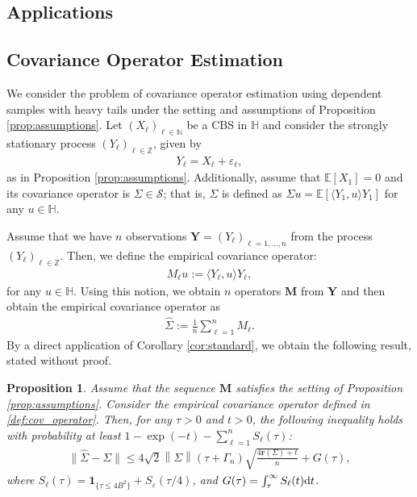 \documentclass[11pt,a4paper]{article}
\newtheorem{proposition}[theorem]{Proposition}
\theoremstyle{remark}
\theoremstyle{definition}
\theoremstyle{definition}
\newcommand{\Ep}{\mathbb{E}}
\renewcommand{\hat}{\widehat}
\newcommand{\Surv}{S}
\newcommand{\rc}{\color{black}}
\begin{document}
\begin{bibunit}[apalike]
\section{Applications} \label{sec:application}

\subsection{Covariance Operator Estimation} \label{sec:ex_covariance}

We consider the problem of covariance operator estimation using dependent samples with heavy tails {\rc under the setting and assumptions of Proposition \ref{prop:assumptions}}.
Let $(X_\ell)_{\ell \in \mathbb{N}}$ be a CBS in $\mathbb{H}$ and consider the strongly stationary process  $(Y_\ell)_{\ell \in \mathbb{Z}}$, given by
\begin{align*}
    Y_\ell = X_\ell + \varepsilon_\ell,
\end{align*}
as in Proposition \ref{prop:assumptions}.
Additionally, assume that $\Ep[X_1] = 0$ and its covariance operator is $\Sigma \in \mathcal{S}$; that is, $\Sigma$ is defined as $\Sigma u = \Ep[ \langle Y_1, u \rangle Y_1]$ for any $u \in \mathbb{H}$.


{\rc Assume that }we have $n$ observations $\mathbf{Y} = (Y_\ell)_{\ell = 1,\ldots,n}$ from the process $(Y_\ell)_{\ell \in \mathbb{Z}}$. Then, we define the empirical covariance operator:
\begin{align*}
    M_\ell u :=\langle Y_\ell, u \rangle Y_\ell,
\end{align*}
for any $u \in \mathbb{H}$.
Using this notion, we obtain $n$ operators $\mathbf{M}$ from $\mathbf{Y}$ and then obtain the empirical covariance operator as 
\begin{align}
    \hat{\Sigma} := \frac{1}{n} \sum_{\ell=1}^n M_\ell. \label{def:cov_operator}
\end{align}
By a direct application of Corollary \ref{cor:standard}, we obtain the following result, stated without proof.
\begin{proposition} \label{prop:covariance}
{\rc Assume that the sequence $\mathbf{M}$ satisfies the setting of Proposition \ref{prop:assumptions}.}
Consider the empirical covariance operator defined in \eqref{def:cov_operator}.
Then, for any $\tau>0$ and $t>0$, the following inequality holds with probability at least $1-\exp(-t)-\sum_{\ell=1}^n \Surv_\ell(\tau)$:
\begin{align*}
    \|\hat{\Sigma}-\Sigma\|\le { 4}\sqrt{2}\left\|\Sigma\right\|\left({\tau+\Gamma_{n}}\right)\sqrt{\frac{4\mathbf{r}\left(\Sigma\right)+t}{n}} + G(\tau),
\end{align*}
where $\Surv_\ell(\tau) =  \mathbf{1}_{\{\tau \leq 4B^2\}} +  \Surv_\varepsilon(\tau/4)$, and $G(\tau) = \int_{\tau}^{\infty} \Surv_\ell(t) {\rm d}t$.
\end{proposition}





\end{bibunit}
\end{document}
